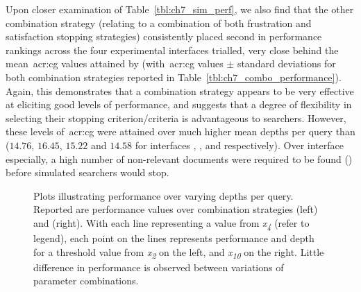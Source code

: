Upon closer examination of Table~\ref{tbl:ch7_sim_perf}, we also find that the other combination strategy  (relating to a combination of both frustration and satisfaction stopping strategies) consistently placed second in performance rankings across the four experimental interfaces trialled, very close behind the mean~\gls{acr:cg} values attained by  (with~\gls{acr:cg} values $\pm$ standard deviations for both combination strategies reported in Table~\ref{tbl:ch7_combo_performance}). Again, this demonstrates that a combination strategy appears to be very effective at eliciting good levels of performance, and suggests that a degree of flexibility in selecting their stopping criterion/criteria is advantageous to searchers. However, these levels of~\gls{acr:cg} were attained over much higher mean depths per query than  ($14.76$, $16.45$, $15.22$ and $14.58$ for interfaces , ,  and  respectively). Over interface  especially, a high number of non-relevant documents were required to be found () before simulated searchers would stop.

\begin{figure}[t!]
    \centering
    \caption[\emph{What-if} performance over combination stopping strategies]{Plots illustrating performance over varying depths per query. Reported are performance values over combination strategies  (left) and  (right). With each line representing a value from \emph{x\textsubscript{4}} (refer to legend), each point on the lines represents performance and depth for a threshold value from \emph{x\textsubscript{2}} on the left, and \emph{x\textsubscript{10}} on the right. Little difference in performance is observed between variations of parameter combinations.}
    \label{fig:ch7_sim_perf_plots_combo}
\end{figure}


